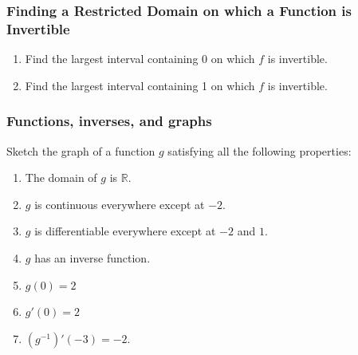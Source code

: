 \documentclass[14pt]{beamer}
\newcommand {\DS} [1] {${\displaystyle #1}$}
\newcommand {\R}{\mathbb{R}}
\begin{document}
\begin{frame}

\frametitle{\small Finding a Restricted Domain on which a Function is Invertible}
\vspace{-3mm}
\begin{center}
		\end{center}
\begin{enumerate}
\item Find the largest interval containing 0 on which $f$ is invertible.
\item Find the largest interval containing 1 on which $f$ is invertible.
\end{enumerate}


\end{frame}





\begin{frame}[t]
\frametitle{Functions, inverses, and graphs }

Sketch the graph of a function $g$ satisfying all the following properties:

\begin{enumerate}
	\item  The domain of $g$ is $\R$.
	\item $g$ is continuous everywhere except at $-2$.
	\item $g$ is differentiable everywhere except at $-2$ and $1$.
	\item  $g$ has an inverse function.
	\item  $g(0)=2$
	\item $g'(0) = 2$
	\item \DS{\left(g^{-1}\right)' (-3) = -2}.
\end{enumerate}

\end{frame}
\end{document}
